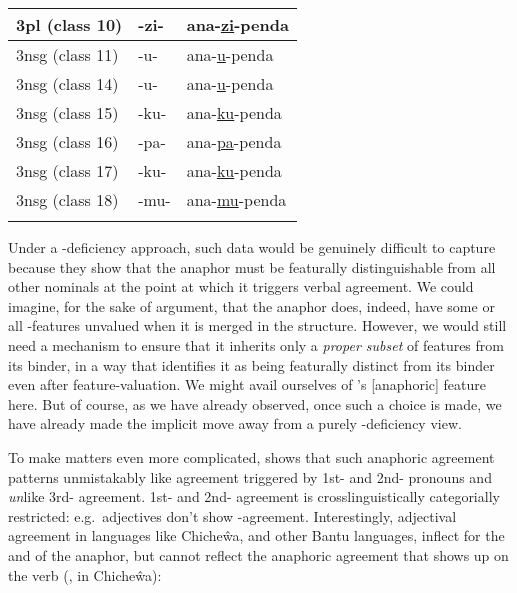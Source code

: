 \documentclass[output=paper, modfonts, nonflat]{langsci/langscibook}
\begin{document}
\begin{table}[h!]
\begin{tabularx}{\textwidth}{XXX}
  \midrule
  3pl (class 10) & -zi- & ana-\ul{zi}-penda\\
  \midrule
  3nsg (class 11) & -u- & ana-\ul{u}-penda\\
  \midrule
  3nsg (class 14) & -u- & ana-\ul{u}-penda\\
  \midrule
  3nsg (class 15) & -ku- & ana-\ul{ku}-penda\\
  \midrule
  3nsg (class 16) & -pa- & ana-\ul{pa}-penda\\
  \midrule
  3nsg (class 17) & -ku- & ana-\ul{ku}-penda\\
  \midrule
  3nsg (class 18) & -mu- & ana-\ul{mu}-penda\\
   \lspbottomrule
\end{tabularx}
\end{table}
\newpage\noindent
Under a \ph-deficiency approach, such data would be genuinely
difficult to capture because they show that the anaphor must be
featurally distinguishable from all other nominals at the point at
which it triggers verbal agreement. We could imagine, for the sake of
argument, that the anaphor does, indeed, have some or all \ph-features
unvalued when it is merged in the structure. However, we would still
need a mechanism to ensure that it inherits only a \emph{proper
  subset} of features from its binder, in a way that identifies it as
being featurally distinct from its binder even after
feature-valuation. We might avail ourselves of \citet{kratzer:2009}'s
[anaphoric] feature here. But of course, as we have already observed,
once such a choice is made, we have already made the implicit move
away from a purely \ph-deficiency view.

To make matters even more complicated, \citet{baker:2008} shows that
such anaphoric agreement patterns unmistakably like agreement
triggered by 1st- and 2nd-\person{} pronouns and \emph{un}like
3rd-\person{} agreement. 1st- and 2nd-\person{} agreement is
crosslinguistically categorially restricted: e.g.\ adjectives don't
show \person-agreement. Interestingly, adjectival agreement in
languages like Chiche\^{w}a, and other Bantu languages, inflect for
the \num{} and \gender{} of the anaphor, but cannot reflect the
anaphoric agreement that shows up on the verb (\citealt[150-151, 86a-b]{baker:2008}, in Chiche\^{w}a):
\end{document}
